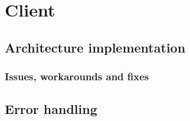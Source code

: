\section{Client}
\label{Implementation_Client}

\subsection[Architecture]{Architecture implementation}
\label{Implementation_Client}

\subsubsection{Issues, workarounds and fixes}
\label{Implementation_Client_Architecture_Issues}

\subsection{Error handling}
\label{Implementation_Client_Error}